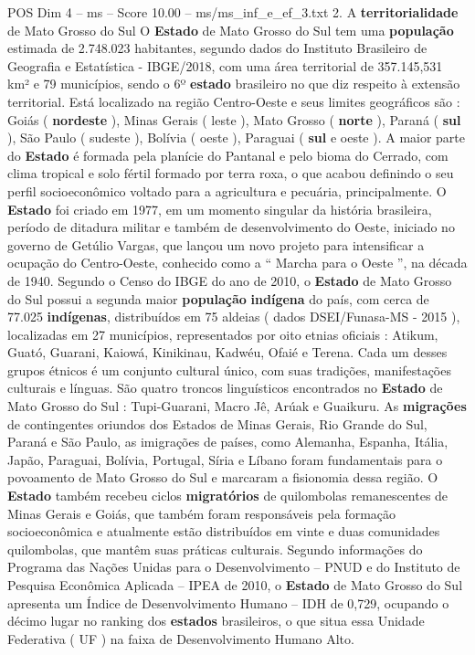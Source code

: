 \begin{textsample}{POS Dim 4 – ms – Score 10.00 – ms/ms\_inf\_e\_ef\_3.txt}  \label{ex:f4_pos_153}
2.
A \textbf{territorialidade} de Mato Grosso do Sul O \textbf{Estado} de Mato Grosso do Sul tem uma \textbf{população} estimada de 2.748.023 habitantes, segundo dados do Instituto Brasileiro de Geografia e Estatística - IBGE/2018, com uma área territorial de 357.145,531 km² e 79 municípios, sendo o 6º \textbf{estado} brasileiro no que diz respeito à extensão territorial.
Está localizado na região Centro-Oeste e seus limites geográficos são : Goiás ( \textbf{nordeste} ), Minas Gerais ( leste ), Mato Grosso ( \textbf{norte} ), Paraná ( \textbf{sul} ), São Paulo ( sudeste ), Bolívia ( oeste ), Paraguai ( \textbf{sul} e oeste ).
A maior parte do \textbf{Estado} é formada pela planície do Pantanal e pelo bioma do Cerrado, com clima tropical e solo fértil formado por terra roxa, o que acabou definindo o seu perfil socioeconômico voltado para a agricultura e pecuária, principalmente.
O \textbf{Estado} foi criado em 1977, em um momento singular da história brasileira, período de ditadura militar e também de desenvolvimento do Oeste, iniciado no governo de Getúlio Vargas, que lançou um novo projeto para intensificar a ocupação do Centro-Oeste, conhecido como a “ Marcha para o Oeste ”, na década de 1940.
Segundo o Censo do IBGE do ano de 2010, o \textbf{Estado} de Mato Grosso do Sul possui a segunda maior \textbf{população} \textbf{indígena} do país, com cerca de 77.025 \textbf{indígenas}, distribuídos em 75 aldeias ( dados DSEI/Funasa-MS - 2015 ), localizadas em 27 municípios, representados por oito etnias oficiais : Atikum, Guató, Guarani, Kaiowá, Kinikinau, Kadwéu, Ofaié e Terena.
Cada um desses grupos étnicos é um conjunto cultural único, com suas tradições, manifestações culturais e línguas.
São quatro troncos linguísticos encontrados no \textbf{Estado} de Mato Grosso do Sul : Tupi-Guarani, Macro Jê, Arúak e Guaikuru.
As \textbf{migrações} de contingentes oriundos dos Estados de Minas Gerais, Rio Grande do Sul, Paraná e São Paulo, as imigrações de países, como Alemanha, Espanha, Itália, Japão, Paraguai, Bolívia, Portugal, Síria e Líbano foram fundamentais para o povoamento de Mato Grosso do Sul e marcaram a fisionomia dessa região.
O \textbf{Estado} também recebeu ciclos \textbf{migratórios} de quilombolas remanescentes de Minas Gerais e Goiás, que também foram responsáveis pela formação socioeconômica e atualmente estão distribuídos em vinte e duas comunidades quilombolas, que mantêm suas práticas culturais.
Segundo informações do Programa das Nações Unidas para o Desenvolvimento – PNUD e do Instituto de Pesquisa Econômica Aplicada – IPEA de 2010, o \textbf{Estado} de Mato Grosso do Sul apresenta um Índice de Desenvolvimento Humano – IDH de 0,729, ocupando o décimo lugar no ranking dos \textbf{estados} brasileiros, o que situa essa Unidade Federativa ( UF ) na faixa de Desenvolvimento Humano Alto.

\end{textsample}
